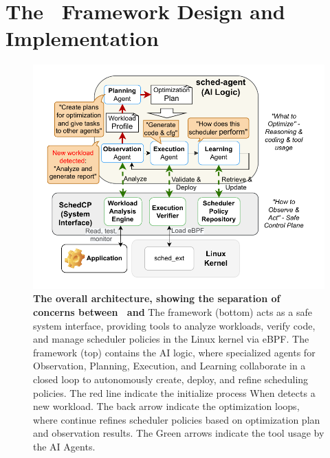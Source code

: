 \section{The \sys\ Framework Design and Implementation}
\label{sec:schedcp_framework}

\begin{figure}
    \centering
    \includegraphics[width=\columnwidth]{sections/img/arch-scheddcp.pdf}
    \caption{
        \textbf{The overall architecture, showing the separation of concerns between \sys\ and \agent } 
        The \textbf{\sys} framework (bottom) acts as a safe system interface, providing tools to analyze workloads, verify code, and manage scheduler policies in the Linux kernel via eBPF.
        The \textbf{\agent} framework (top) contains the AI logic, where specialized agents for Observation, Planning, Execution, and Learning collaborate in a closed loop to autonomously create, deploy, and refine scheduling policies. The red line indicate the initialize process When \sys detects a new workload. The back arrow indicate the optimization loops, where \agent continue refines scheduler policies based on optimization plan and observation results. The Green arrows indicate the tool usage by the AI Agents.
    }
    \label{fig:frameworkarch}
\end{figure}

